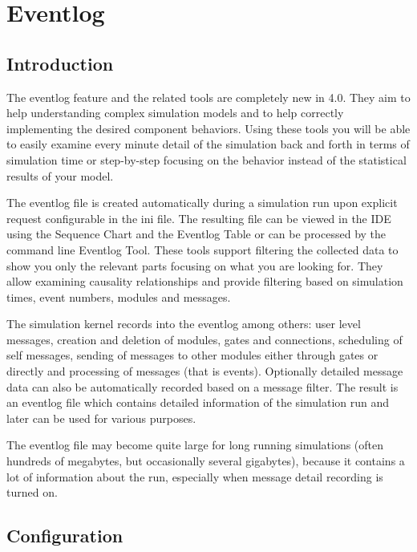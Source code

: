\chapter{Eventlog}
\label{cha:eventlog}

\section{Introduction}
The eventlog feature and the related tools are completely new in {\opp} 4.0. They aim to
help understanding complex simulation models and to help correctly implementing the
desired component behaviors. Using these tools you will be able to easily examine every
minute detail of the simulation back and forth in terms of simulation time or step-by-step
focusing on the behavior instead of the statistical results of your model.

The eventlog file is created automatically during a simulation run upon explicit request
configurable in the ini file. The resulting file can be viewed in the {\opp} IDE using
the Sequence Chart and the Eventlog Table or can be processed by the command line Eventlog
Tool. These tools support filtering the collected data to show you only the relevant parts
focusing on what you are looking for. They allow examining causality relationships and
provide filtering based on simulation times, event numbers, modules and messages.

The simulation kernel records into the eventlog among others: user level messages,
creation and deletion of modules, gates and connections, scheduling of self messages,
sending of messages to other modules either through gates or directly and processing of
messages (that is events). Optionally detailed message data can also be automatically
recorded based on a message filter. The result is an eventlog file which contains detailed
information of the simulation run and later can be used for various purposes.

\begin{note}
    The eventlog file may become quite large for long running simulations
    (often hundreds of megabytes, but occasionally several gigabytes), because it
    contains a lot of information about the run, especially when message detail
    recording is turned on.
\end{note}

\section{Configuration}

